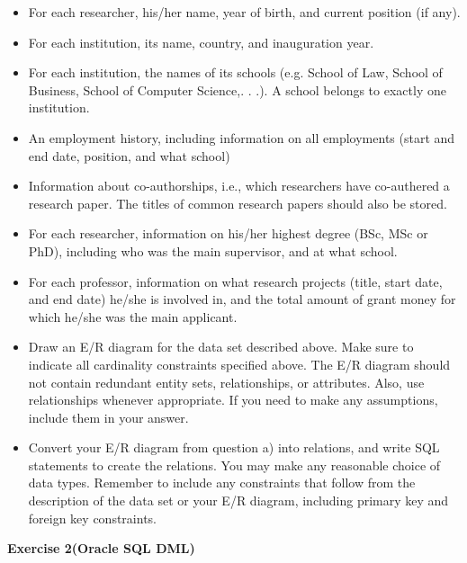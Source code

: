 \documentclass[12pt]{article}
\begin{document}
\begin{itemize}
\item
For each researcher, his/her name, year of birth, and current position (if any). 

\item 
For each institution, its name, country, and inauguration year.

\item 
For each institution, the names of its schools (e.g. School of Law, School of Business,
School of Computer Science,. . .). A school belongs to exactly one institution.

\item 
An employment history, including information on all employments (start and end
date, position, and what school)
\item
Information about co-authorships, i.e., which researchers have co-authered a research
paper. The titles of common research papers should also be stored.

\item
For each researcher, information on his/her highest degree (BSc, MSc or PhD), 
including who was the main supervisor, and at what school.

\item
For each professor, information on what research projects (title, start date, and end
date) he/she is involved in, and the total amount of grant money for which he/she
was the main applicant.
\end{itemize}

\begin{itemize}
\item
Draw an E/R diagram for the data set described above. Make sure to indicate all
cardinality constraints speciﬁed above. The E/R diagram should not contain redundant
entity sets, relationships, or attributes. Also, use relationships whenever appropriate. If
you need to make any assumptions, include them in your answer.
\item
Convert your E/R diagram from question a) into relations, and write SQL statements
to create the relations. You may make any reasonable choice of data types. Remember
to include any constraints that follow from the description of the data set or your E/R
diagram, including primary key and foreign key constraints.
\end{itemize}
 
\newpage
\textbf{Exercise 2(Oracle SQL DML)}\\
\end{document}
